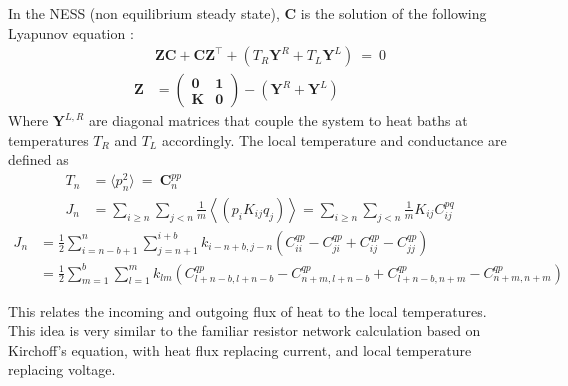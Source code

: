 In the NESS (non equilibrium steady state), $\mathbf{C}$ 
is the solution of the following Lyapunov equation 
\cite{bodyfelt_unpub,zheng,zheng_heat_2011,bhatia_how_1997,dhar_heat_2008,rieder_properties_1967,*nakazawa_energy_1968,*matsuda_localization_1970}:
%
\begin{align}
&\mathbf{Z}\mathbf{C} + \mathbf{C}\mathbf{Z}^\intercal + (T_R\mathbf{Y}^R+T_L\mathbf{Y}^L) \ =\  0\\
\mathbf{Z} &= 
              \begin{pmatrix} 
                \mathbf{0} & \mathbf{1} \\
                \mathbf{K} & \mathbf{0} 
              \end{pmatrix} -(\mathbf{Y}^R+\mathbf{Y}^L)
\end{align}
%
Where $\mathbf{Y}^{L,R}$ are diagonal matrices that couple
the system to heat baths at temperatures $T_R$ and $T_L$ accordingly.
%
The local temperature and conductance are defined as
\begin{align}
T_n &= \langle p_n^2 \rangle \ = \ \mathbf{C}^{pp}_{n} \\
J_n &= \sum_{i\ge n}\sum_{j<n} \frac{1}{m}\left\langle \left(p_i K_{ij} q_j\right) \right\rangle 
= \sum_{i\ge n}\sum_{j<n}\frac{1}{m}  K_{ij} C^{pq}_{ij}
\end{align}
\begin{align}
J_n &= \frac{1}{2}\sum_{i=n-b+1}^n \sum_{j=n+1}^{i+b} k_{i-n+b,j-n}(C^{qp}_{ii}-C^{qp}_{ji}+C^{qp}_{ij}-C^{qp}_{jj})\\
&= \frac{1}{2}\sum_{m=1}^b\sum_{l=1}^m k_{lm} (C^{qp}_{l+n-b,l+n-b}-C^{qp}_{n+m,l+n-b}+C^{qp}_{l+n-b,n+m}-C^{qp}_{n+m,n+m})
\end{align}

This relates the incoming and outgoing flux of heat 
to the local temperatures. This idea is very similar
to the familiar resistor network calculation based on Kirchoff's equation, with 
heat flux replacing current, and local temperature replacing voltage. 
 

\begin{comment}
\section{Banded matrices spectrum}


For wide bandwidth and uncorrelated matrix elements, the high eigenvalues
should follow the Wigner semicircle law ($g(\lambda) = \frac{2}{\pi R^2}\sqrt{R^2-\lambda^2}$)
\cite{erdos_local_2012,fyodorov_scaling_1991,wigner_characteristic_1955}. However,
the low eigenvalues can still follow other rules, allowing for a transition
between diffusion and subdiffusion.
\end{comment}




